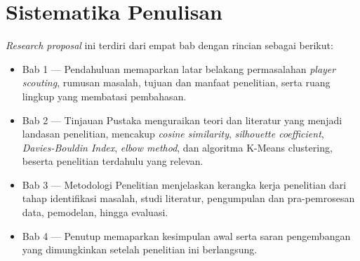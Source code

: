 \section{Sistematika Penulisan}
\label{sec:sistematika}

\emph{Research proposal} ini terdiri dari empat bab dengan rincian sebagai berikut:

\begin{itemize}
  \item Bab 1 --- Pendahuluan memaparkan latar belakang permasalahan \emph{player scouting}, rumusan masalah, tujuan dan manfaat penelitian, serta ruang lingkup yang membatasi pembahasan.
  \item Bab 2 --- Tinjauan Pustaka menguraikan teori dan literatur yang menjadi landasan penelitian, mencakup \emph{cosine similarity}, \emph{silhouette coefficient}, \emph{Davies-Bouldin Index}, \emph{elbow method}, dan algoritma K-Means clustering, beserta penelitian terdahulu yang relevan.
  \item Bab 3 --- Metodologi Penelitian menjelaskan kerangka kerja penelitian dari tahap identifikasi masalah, studi literatur, pengumpulan dan pra-pemrosesan data, pemodelan, hingga evaluasi.
  \item Bab 4 --- Penutup memaparkan kesimpulan awal serta saran pengembangan yang dimungkinkan setelah penelitian ini berlangsung.
\end{itemize}
